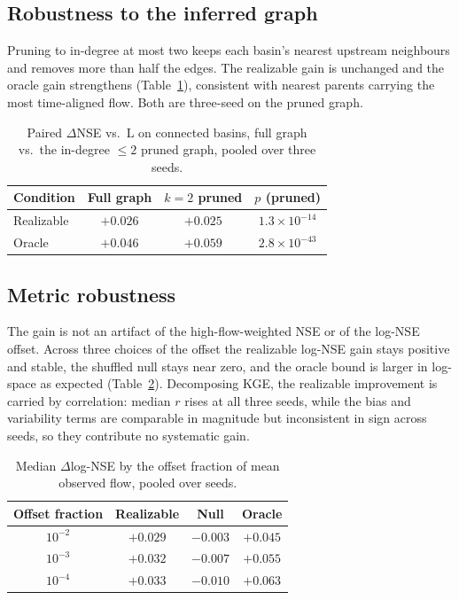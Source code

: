 \documentclass[11pt]{article}
\begin{document}
\subsection{Robustness to the inferred graph}
\label{app:k2}

Pruning to in-degree at most two keeps each basin's nearest upstream neighbours and removes more than
half the edges. The realizable gain is unchanged and the oracle gain strengthens
(Table~\ref{tab:k2}), consistent with nearest parents carrying the most time-aligned flow. Both are
three-seed on the pruned graph.

\begin{table}[h]
\centering
\caption{Paired $\Delta$NSE vs.\ $\mathrm{L}$ on connected basins, full graph vs.\ the in-degree
$\leq 2$ pruned graph, pooled over three seeds.}
\label{tab:k2}
\begin{tabular}{lccc}
\toprule
Condition & Full graph & $k{=}2$ pruned & $p$ (pruned) \\
\midrule
Realizable & $+0.026$ & $+0.025$ & $1.3\times10^{-14}$ \\
Oracle & $+0.046$ & $+0.059$ & $2.8\times10^{-43}$ \\
\bottomrule
\end{tabular}
\end{table}

\subsection{Metric robustness}
\label{app:metric}

The gain is not an artifact of the high-flow-weighted NSE or of the log-NSE offset. Across three
choices of the offset the realizable log-NSE gain stays positive and stable, the shuffled null stays
near zero, and the oracle bound is larger in log-space as expected (Table~\ref{tab:metric}).
Decomposing KGE, the realizable improvement is carried by correlation: median $r$ rises at all
three seeds, while the bias and variability terms are comparable in magnitude but inconsistent in
sign across seeds, so they contribute no systematic gain.

\begin{table}[h]
\centering
\caption{Median $\Delta$log-NSE by the offset fraction of mean observed flow, pooled over seeds.}
\label{tab:metric}
\begin{tabular}{cccc}
\toprule
Offset fraction & Realizable & Null & Oracle \\
\midrule
$10^{-2}$ & $+0.029$ & $-0.003$ & $+0.045$ \\
$10^{-3}$ & $+0.032$ & $-0.007$ & $+0.055$ \\
$10^{-4}$ & $+0.033$ & $-0.010$ & $+0.063$ \\
\bottomrule
\end{tabular}
\end{table}
\end{document}
